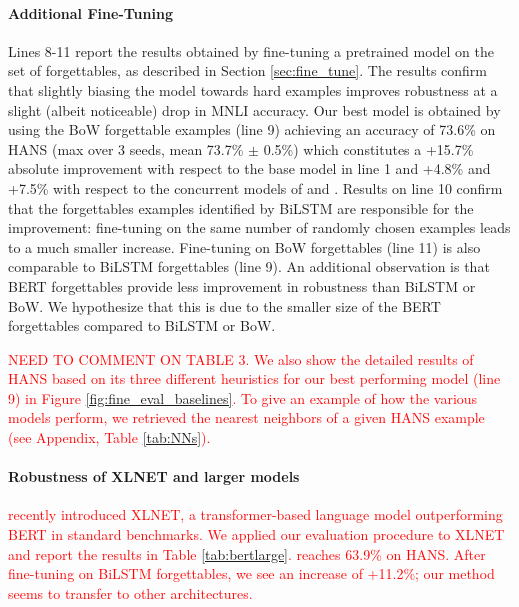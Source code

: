 \paragraph{Additional Fine-Tuning} Lines 8-11 report the results obtained by fine-tuning a pretrained model on the set of forgettables, as described in Section \ref{sec:fine_tune}. The results confirm that slightly biasing the model towards hard examples improves robustness at a slight (albeit noticeable) drop in MNLI accuracy. 
Our best model is obtained by using the BoW forgettable examples (line 9) achieving an accuracy of 73.6\% on HANS (max over 3 seeds, mean 73.7\% $\pm$ 0.5\%)
which constitutes a +15.7\% absolute improvement with respect to the base model in line 1 and +4.8\% and +7.5\% with respect to the concurrent models of  and . 
Results on line 10 confirm that the forgettables examples identified by BiLSTM are responsible for the improvement: fine-tuning on the same number of randomly chosen examples leads to a much smaller increase. 
Fine-tuning on BoW forgettables (line 11) is also comparable to BiLSTM forgettables (line 9).
An additional observation is that BERT forgettables provide less improvement in robustness than BiLSTM or BoW. 
We hypothesize that this is due to the smaller size of the BERT forgettables compared to BiLSTM or BoW.

\textcolor{red}{NEED TO COMMENT ON TABLE 3. We also show the detailed results of HANS based on its three different heuristics for our best performing model (line 9) in Figure \ref{fig:fine_eval_baselines}. 
To give an example of how the various models perform, we retrieved the nearest neighbors of a given HANS example (see Appendix, Table \ref{tab:NNs}).}



\paragraph{Robustness of XLNET and larger models}
\textcolor{red}{\citet{yang2019xlnet} recently introduced XLNET, a transformer-based language model outperforming BERT in standard benchmarks. We applied our evaluation procedure to XLNET and report the results in Table \ref{tab:bertlarge}. \xlnetbase reaches 63.9\% on HANS. After fine-tuning on BiLSTM forgettables, we see an increase of +11.2\%; our method seems to transfer to other architectures.}

